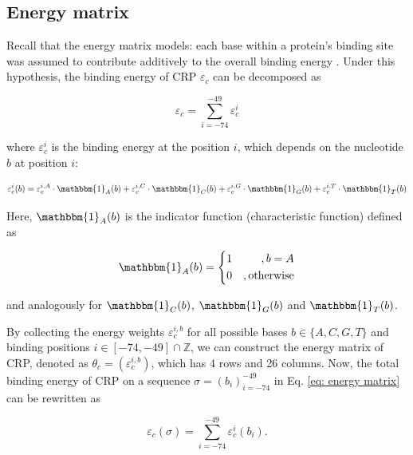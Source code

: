 \documentclass{article}
\begin{document}
\subsection{Energy matrix}\label{sup sec: energy matrix model}

Recall that the energy matrix models: each base within a protein’s binding site was assumed to contribute additively to the overall binding energy \cite{Kinney2010PNAS}. Under this hypothesis, the binding energy of CRP $\varepsilon_c$ can be decomposed as

\begin{equation}\label{eq: energy matrix}
    \varepsilon_c = \sum_{i=-74}^{-49} \varepsilon_c^{i}
\end{equation}

\noindent where $\varepsilon_c^{i}$ is the binding energy at the position $i$, which depends on the nucleotide $b$ at position $i$:

\begin{equation}\label{eq: energy at site i}
    \varepsilon_c^{i} (b) 
    = \varepsilon_c^{i,A} \cdot \mathbbm{1}_A(b)+\varepsilon_c^{i,C} \cdot \mathbbm{1}_C(b)+\varepsilon_c^{i,G} \cdot \mathbbm{1}_G(b)+\varepsilon_c^{i,T} \cdot \mathbbm{1}_T(b)
\end{equation}

Here, $\mathbbm{1}_A(b)$ is the indicator function (characteristic function) defined as 

\begin{equation}
\begin{aligned}
\mathbbm{1}_A(b)=\left\{
\begin{aligned}
& 1 &,b=A \\
& 0 &,\text{otherwise}
\end{aligned}
\right.
\end{aligned}
\end{equation}

\noindent and analogously for $\mathbbm{1}_C(b)$, $\mathbbm{1}_G(b)$ and $\mathbbm{1}_T(b)$.

By collecting the energy weights $\varepsilon_c^{i,b}$ for all possible bases $b\in\{A,C,G,T\}$ and binding positions $i\in [-74,-49]\cap\mathbb{Z}$, we can construct the energy matrix of CRP, denoted as $\theta_c=(\varepsilon_c^{i,b})$, which has 4 rows and 26 columns. Now, the total binding energy of CRP on a sequence $\sigma=(b_i)_{i=-74}^{-49}$ in Eq. \ref{eq: energy matrix} can be rewritten as

\begin{equation}\label{eq: energy matrix function}
    \varepsilon_c(\sigma) = \sum_{i=-74}^{-49} \varepsilon_c^{i}(b_i).
\end{equation}
\end{document}
